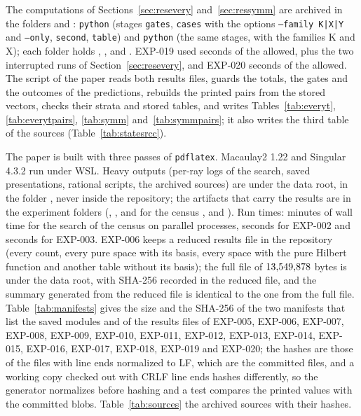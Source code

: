 \documentclass[11pt]{article}
\theoremstyle{definition}
\theoremstyle{remark}
\newcommand{\EXP}[1]{\mbox{EXP-#1}}
\begin{document}
The computations of Sections~\ref{sec:resevery} and~\ref{sec:ressymm} are archived in the folders  and : \texttt{python}  (stages \texttt{gates}, \texttt{cases} with the options \texttt{--family K|X|Y} and \texttt{--only}, \texttt{second}, \texttt{table}) and \texttt{python}  (the same stages, with the families K and X); each folder holds , ,  and . \EXP{019} used \nevtSeconds{} seconds of the \nevtLimit{} allowed, plus the two interrupted runs of Section~\ref{sec:resevery}, and \EXP{020} \nsymSeconds{} seconds of the \nsymLimit{} allowed. The script of the paper reads both results files, guards the totals, the gates and the outcomes of the predictions, rebuilds the printed pairs from the stored vectors, checks their strata and stored tables, and writes Tables~\ref{tab:everyt}, \ref{tab:everytpairs}, \ref{tab:symm} and~\ref{tab:symmpairs}; it also writes the third table of the sources (Table~\ref{tab:statesrcc}).

The paper is built with three passes of \texttt{pdflatex}. Macaulay2 1.22 and Singular 4.3.2 run under WSL. Heavy outputs (per-ray logs of the search, saved presentations, rational scripts, the archived sources) are under the data root, in the folder , never inside the repository; the artifacts that carry the results are in the experiment folders (, , and for the census ,  and ). Run times: \nsearchWallMin{} minutes of wall time for the search of the census on parallel processes, \ntwoWall{} seconds for \EXP{002} and \nthreeWall{} seconds for \EXP{003}. \EXP{006} keeps a reduced results file in the repository (every count, every pure space with its basis, every space with the pure Hilbert function and another table without its basis); the full file of $13{,}549{,}878$ bytes is under the data root, with SHA-256 \texttt{\nsixFullShaA\allowbreak\nsixFullShaB} recorded in the reduced file, and the summary generated from the reduced file is identical to the one from the full file. Table~\ref{tab:manifests} gives the size and the SHA-256 of the two manifests that list the saved modules and of the results files of \EXP{005}, \EXP{006}, \EXP{007}, \EXP{008}, \EXP{009}, \EXP{010}, \EXP{011}, \EXP{012}, \EXP{013}, \EXP{014}, \EXP{015}, \EXP{016}, \EXP{017}, \EXP{018}, \EXP{019} and \EXP{020}; the hashes are those of the files with line ends normalized to LF, which are the committed files, and a working copy checked out with CRLF line ends hashes differently, so the generator normalizes before hashing and a test compares the printed values with the committed blobs. Table~\ref{tab:sources} the \nsourcesArchived{} archived sources with their hashes.
\endgroup
\end{document}
